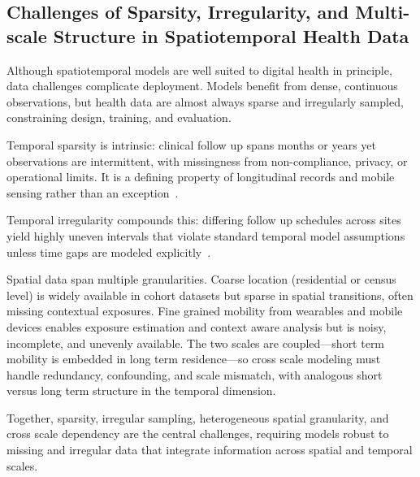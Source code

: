 \documentclass[journal]{IEEEtran}
\begin{document}
\subsection{Challenges of Sparsity, Irregularity, and Multi-scale Structure in Spatiotemporal Health Data}
Although spatiotemporal models are well suited to digital health in principle, data challenges complicate deployment. Models benefit from dense, continuous observations, but health data are almost always sparse and irregularly sampled, constraining design, training, and evaluation.

Temporal sparsity is intrinsic: clinical follow up spans months or years yet observations are intermittent, with missingness from non-compliance, privacy, or operational limits. It is a defining property of longitudinal records and mobile sensing rather than an exception~\cite{che2018grud}.

Temporal irregularity compounds this: differing follow up schedules across sites yield highly uneven intervals that violate standard temporal model assumptions unless time gaps are modeled explicitly~\cite{shukla2021irregular}.

Spatial data span multiple granularities. Coarse location (residential or census level) is widely available in cohort datasets but sparse in spatial transitions, often missing contextual exposures. Fine grained mobility from wearables and mobile devices enables exposure estimation and context aware analysis but is noisy, incomplete, and unevenly available. The two scales are coupled---short term mobility is embedded in long term residence---so cross scale modeling must handle redundancy, confounding, and scale mismatch, with analogous short versus long term structure in the temporal dimension.

Together, sparsity, irregular sampling, heterogeneous spatial granularity, and cross scale dependency are the central challenges, requiring models robust to missing and irregular data that integrate information across spatial and temporal scales.
\end{document}
